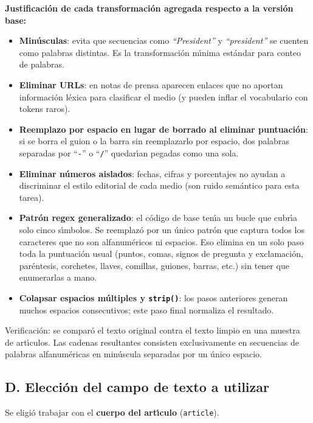 \documentclass[11pt,a4paper]{article}
\begin{document}
\textbf{Justificaci\'{o}n de cada transformaci\'{o}n agregada respecto a la versi\'{o}n base:}

\begin{itemize}
    \item \textbf{Min\'{u}sculas}: evita que secuencias como \textit{``President''} y \textit{``president''} se cuenten como palabras distintas. Es la transformaci\'{o}n m\'{\i}nima est\'{a}ndar para conteo de palabras.
    \item \textbf{Eliminar URLs}: en notas de prensa aparecen enlaces que no aportan informaci\'{o}n l\'{e}xica para clasificar el medio (y pueden inflar el vocabulario con tokens raros).
    \item \textbf{Reemplazo por espacio en lugar de borrado al eliminar puntuaci\'{o}n}: si se borra el guion o la barra sin reemplazarlo por espacio, dos palabras separadas por ``\texttt{-}'' o ``\texttt{/}'' quedar\'{\i}an pegadas como una sola.
    \item \textbf{Eliminar n\'{u}meros aislados}: fechas, cifras y porcentajes no ayudan a discriminar el estilo editorial de cada medio (son ruido sem\'{a}ntico para esta tarea).
    \item \textbf{Patr\'{o}n regex generalizado}: el c\'{o}digo de base ten\'{\i}a un bucle que cubr\'{\i}a solo cinco s\'{\i}mbolos. Se reemplaz\'{o} por un \'{u}nico patr\'{o}n que captura todos los caracteres que no son alfanum\'{e}ricos ni espacios. Eso elimina en un solo paso toda la puntuaci\'{o}n usual (puntos, comas, signos de pregunta y exclamaci\'{o}n, par\'{e}ntesis, corchetes, llaves, comillas, guiones, barras, etc.) sin tener que enumerarlas a mano.
    \item \textbf{Colapsar espacios m\'{u}ltiples y \texttt{strip()}}: los pasos anteriores generan muchos espacios consecutivos; este paso final normaliza el resultado.
\end{itemize}

Verificaci\'{o}n: se compar\'{o} el texto original contra el texto limpio en una muestra de art\'{\i}culos. Las cadenas resultantes consisten exclusivamente en secuencias de palabras alfanum\'{e}ricas en min\'{u}scula separadas por un \'{u}nico espacio.


\subsection{D. Elecci\'{o}n del campo de texto a utilizar}

Se eligi\'{o} trabajar con el \textbf{cuerpo del art\'{\i}culo} (\texttt{article}).
\end{document}
